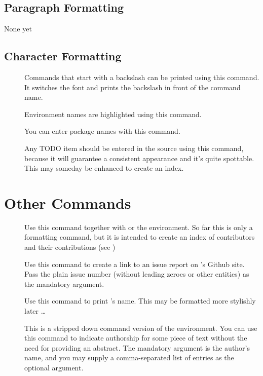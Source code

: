 \documentclass[openLilyLib_CG]{subfiles}
\begin{document}
\subsection{Paragraph Formatting}
\begin{description}
\item[None yet]
\end{description}

\subsection{Character Formatting}

\begin{description}
\item[] Commands that start with a backslash can be printed using this command. It switches the font and prints the backslash in front of the command name.
\item[] Environment names are highlighted using this command.
\item[] You can enter package names with this command.
\item[] Any TODO item should be entered in the source using this command, because it will guarantee a consistent appearance and it's quite spottable.
This may someday be enhanced to create an index.
\end{description}

\section{Other Commands}
\begin{description}
\item[] Use this command together with  or the  environment.
So far this is only a formatting command, but it is intended to create an index of contributors and their contributions (see )
\item[] Use this command to create a link to an issue report on \openlilylib's Github site.
Pass the plain issue number (without leading zeroes or other entities) as the mandatory argument.
\item[] Use this command to print \openlilylib's name.
This may be formatted more stylishly later \dots
\item[] This is a stripped down command version of the  environment.
You can use this command to indicate authorship for some piece of text without the need for providing an abstract.
The mandatory argument is the author's name, and you may supply a comma-separated list of  entries as the optional argument.
\end{description}
\end{document}
